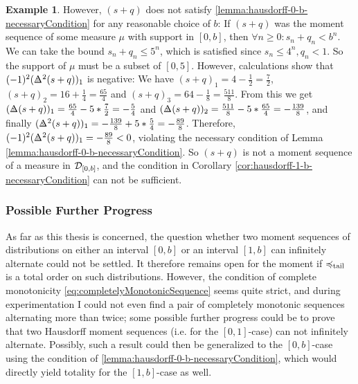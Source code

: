 \documentclass[a4paper]{scrreprt}
\theoremstyle{definition}
\newtheorem{ex}[thm]{Example} %
\begin{document}
\begin{ex}
        However, $(s+q)$ does not satisfy \ref{lemma:hausdorff-0-b-necessaryCondition} for any reasonable choice of $b$:
        If $(s+q)$ was the moment sequence of some measure $\mu$ with support in $[0, b]$, then $\forall n \geq 0: s_n + q_n < b^n$.
        We can take the bound $s_n + q_n \leq 5^n$, which is satisfied since $s_n \leq 4^n, q_n < 1$. So the support of $\mu$ must be a subset of $[0, 5]$.
        However, calculations show that $(-1)^2 (\DeltaB{5}^2 (s+q))_1$ is negative:
        We have $(s+q)_1 = 4 - \frac{1}{2} = \frac{7}{2}$, $(s+q)_2 = 16 + \frac{1}{4} = \frac{65}{4}$ and $(s+q)_3 = 64 - \frac{1}{8} = \frac{511}{8}$.
        From this we get $(\DeltaB{5} (s+q))_1 = \frac{65}{4} - 5 * \frac{7}{2} = - \frac{5}{4}$ and $(\DeltaB{5} (s+q))_2 = \frac{511}{8} - 5 * \frac{65}{4} = - \frac{139}{8}$, and finally $(\DeltaB{5}^2 (s+q))_1 = - \frac{139}{8} + 5*\frac{5}{4} = - \frac{89}{8}$.
        Therefore, $(-1)^2 (\DeltaB{5}^2 (s+q))_1  = - \frac{89}{8} < 0$, violating the necessary condition of Lemma \ref{lemma:hausdorff-0-b-necessaryCondition}.        
        So $(s+q)$ is not a moment sequence of a measure in $\mathcal{D}_{[0, b]}$, and the condition in Corollary \ref{cor:hausdorff-1-b-necessaryCondition} can not be sufficient.
    \end{ex}

    \subsubsection{Possible Further Progress}

    As far as this thesis is concerned, the question whether two moment sequences of distributions on either an interval $[0, b]$ or an interval $[1, b]$ can infinitely alternate could not be settled. It therefore remains open for the moment if $\preccurlyeq_{\text{tail}}$ is a total order on such distributions.
    However, the condition of complete monotonicity \eqref{eq:completelyMonotonicSequence} seems quite strict, and during experimentation I could not even find a pair of completely monotonic sequences alternating more than twice; some possible further progress could be to prove that two Hausdorff moment sequences (i.e. for the $[0, 1]$-case) can not infinitely alternate. Possibly, such a result could then be generalized to the $[0, b]$-case using the condition of \ref{lemma:hausdorff-0-b-necessaryCondition}, which would directly yield totality for the $[1, b]$-case as well.
    
\end{document}

